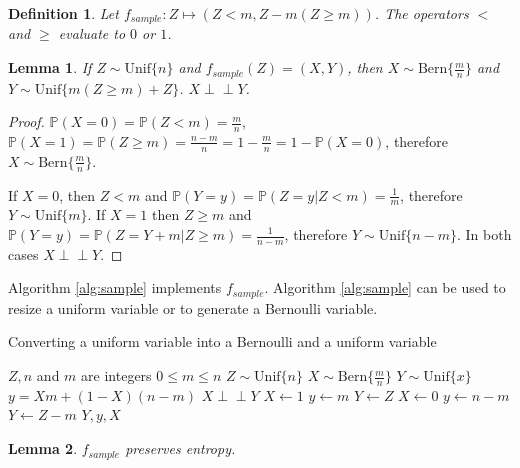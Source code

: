 \documentclass[lettersize,onecolumn]{IEEEtran}
\newtheorem{lemma}{Lemma}
\newtheorem{definition}{Definition}
\newcommand{\indep}{\perp\!\!\!\perp}
\newcommand{\unif}[1]{\mathrm{Unif}\{#1\}}
\newcommand{\bern}[1]{\mathrm{Bern}\{#1\}}
\newcommand{\prob}[1]{\mathbb{P}(#1)}
\begin{document}
\begin{definition}
Let $f_{sample}: Z \mapsto (Z<m, Z - m(Z\ge m))$. The operators $<$ and $\ge$ evaluate to $0$ or $1$.
\label{def:sample}
\end{definition}

\begin{lemma}
If $Z \sim \unif{n}$ and $f_{sample}(Z) = (X,Y)$, then $X \sim \bern{\frac{m}{n}}$ and $Y \sim \unif{m(Z \ge m)+Z}$. $X \indep Y$.
\label{lem:sample}
\end{lemma}

\begin{proof}
    $\prob{X=0} = \prob{Z < m} = \frac{m}{n}$, $\prob{X=1} = \prob{Z \ge m} = \frac{n-m}{n} = 1 - \frac{m}{n} = 1 - \prob{X=0}$, therefore $X \sim \bern{\frac{m}{n}}$.

    If $X=0$, then $Z<m$ and $\prob{Y=y} = \prob{Z=y | Z<m} = \frac{1}{m}$, therefore $Y \sim \unif{m}$. If $X=1$ then $Z\ge m$ and $\prob{Y=y} = \prob{Z = Y + m| Z\ge m} = \frac{1}{n-m}$, therefore $Y \sim \unif{n-m}$. In both cases $X \indep Y$.
\end{proof}

Algorithm \ref{alg:sample} implements $f_{sample}$. Algorithm \ref{alg:sample} can be used to resize a uniform variable or to generate a Bernoulli variable.

\begin{algorithm}
\caption{Converting a uniform variable into a Bernoulli and a uniform variable}
\label{alg:sample}
\begin{algorithmic}[1]
    \Require $Z, n$ and $m$ are integers 
    \Require $0 \le m \le n$
    \Require $Z \sim \unif{n}$
    \Ensure $X \sim \bern{\frac{m}{n}}$
    \Ensure $Y \sim \unif{x}$
    \Ensure $y = Xm + (1-X)(n-m)$
    \Ensure $X \indep Y$
    \State $X \gets 1$  
    \State $y \gets m$
    \State $Y \gets Z$
  \Else
    \State $X \gets 0$  
    \State $y \gets n-m$
    \State $Y \gets Z-m$
  \EndIf
  \State \Return $Y, y, X$
\EndProcedure
\end{algorithmic}
\end{algorithm}

\begin{lemma}
    $f_{sample}$ preserves entropy.
    \label{lem:sample-entropy}
\end{lemma}
\end{document}
